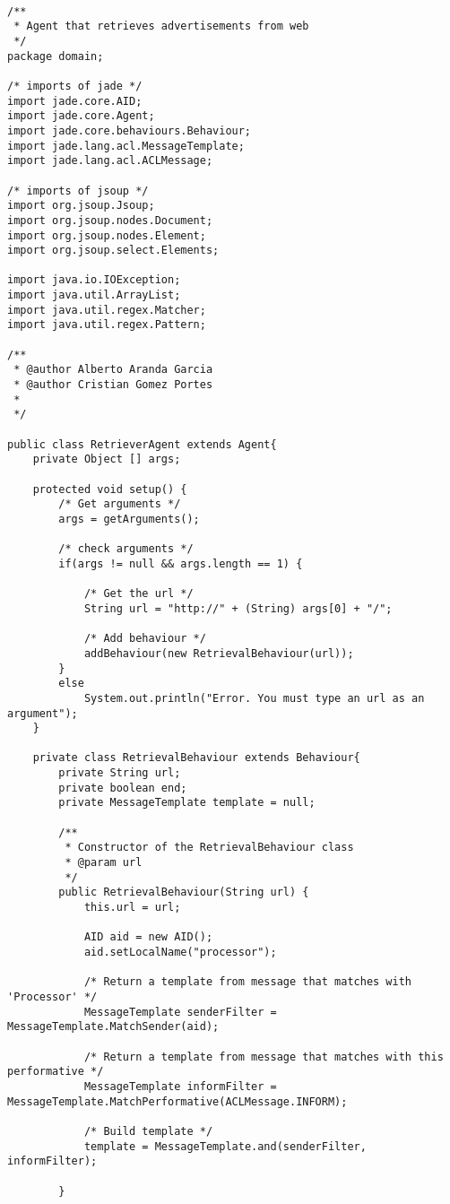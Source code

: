 \documentclass{pre-tfg}
\begin{document}
\begin{lstlisting}[caption=Código de recuperación de links de una URL,style=java]

/**
 * Agent that retrieves advertisements from web
 */
package domain;

/* imports of jade */
import jade.core.AID;
import jade.core.Agent;
import jade.core.behaviours.Behaviour;
import jade.lang.acl.MessageTemplate;
import jade.lang.acl.ACLMessage;

/* imports of jsoup */
import org.jsoup.Jsoup;
import org.jsoup.nodes.Document;
import org.jsoup.nodes.Element;
import org.jsoup.select.Elements;

import java.io.IOException;
import java.util.ArrayList;
import java.util.regex.Matcher;
import java.util.regex.Pattern;

/**
 * @author Alberto Aranda Garcia
 * @author Cristian Gomez Portes
 *
 */

public class RetrieverAgent extends Agent{
	private Object [] args;

	protected void setup() {
		/* Get arguments */
		args = getArguments();

		/* check arguments */
		if(args != null && args.length == 1) {

			/* Get the url */
			String url = "http://" + (String) args[0] + "/";

			/* Add behaviour */
			addBehaviour(new RetrievalBehaviour(url));
		}
		else
			System.out.println("Error. You must type an url as an argument");
	}

	private class RetrievalBehaviour extends Behaviour{
		private String url;
		private boolean end;
		private MessageTemplate template = null;

		/**
		 * Constructor of the RetrievalBehaviour class
		 * @param url
		 */
		public RetrievalBehaviour(String url) {
			this.url = url;

			AID aid = new AID();
			aid.setLocalName("processor");

			/* Return a template from message that matches with 'Processor' */
			MessageTemplate senderFilter = MessageTemplate.MatchSender(aid);

			/* Return a template from message that matches with this performative */
			MessageTemplate informFilter = MessageTemplate.MatchPerformative(ACLMessage.INFORM);

			/* Build template */
			template = MessageTemplate.and(senderFilter, informFilter);

		}


\end{lstlisting}
\end{document}
